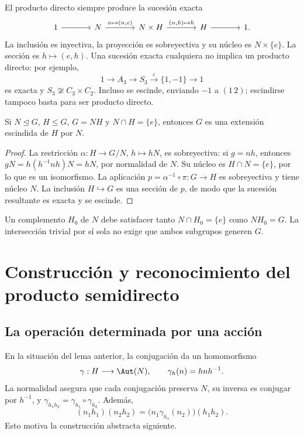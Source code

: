 El producto directo siempre produce la sucesión exacta
\[
\begin{tikzcd}[column sep=large]
1\arrow[r]&N\arrow[r,"{n\mapsto(n,e)}"]&N\times H\arrow[r,"{(n,h)\mapsto h}"]&H\arrow[r]&1.
\end{tikzcd}
\]
La inclusión es inyectiva, la proyección es sobreyectiva y su núcleo es $N\times\{e\}$. La sección es $h\mapsto(e,h)$. Una sucesión exacta cualquiera no implica un producto directo: por ejemplo,
\[
1\longrightarrow A_3\longrightarrow S_3
\overset{\varepsilon}{\longrightarrow}\{1,-1\}\longrightarrow1
\]
es exacta y $S_3\not\cong C_3\times C_2$. Incluso se escinde, enviando $-1$ a $(1\,2)$; escindirse tampoco basta para ser producto directo.

\begin{lema}\label{lema:C10-escision}
Si $N\trianglelefteq G$, $H\le G$, $G=NH$ y $N\cap H=\{e\}$, entonces $G$ es una extensión escindida de $H$ por $N$.
\end{lema}
\begin{proof}
La restricción $\alpha:H\to G/N$, $h\mapsto hN$, es sobreyectiva: si $g=nh$, entonces $gN=h(h^{-1}nh)N=hN$, por normalidad de $N$. Su núcleo es $H\cap N=\{e\}$, por lo que es un isomorfismo. La aplicación $p=\alpha^{-1}\circ\pi:G\to H$ es sobreyectiva y tiene núcleo $N$. La inclusión $H\hookrightarrow G$ es una sección de $p$, de modo que la sucesión resultante es exacta y se escinde.
\end{proof}
\begin{obs}
Un complemento $H_0$ de $N$ debe satisfacer tanto $N\cap H_0=\{e\}$ como $NH_0=G$. La intersección trivial por sí sola no exige que ambos subgrupos generen $G$.
\end{obs}

\section{Construcción y reconocimiento del producto semidirecto}
\subsection{La operación determinada por una acción}
En la situación del lema anterior, la conjugación da un homomorfismo
\[
\gamma:H\longrightarrow\Aut(N),\qquad \gamma_h(n)=hnh^{-1}.
\]
La normalidad asegura que cada conjugación preserva $N$, su inversa es conjugar por $h^{-1}$, y $\gamma_{h_1h_2}=\gamma_{h_1}\circ\gamma_{h_2}$. Además,
\[
(n_1h_1)(n_2h_2)=\bigl(n_1\gamma_{h_1}(n_2)\bigr)(h_1h_2).
\]
Esto motiva la construcción abstracta siguiente.

